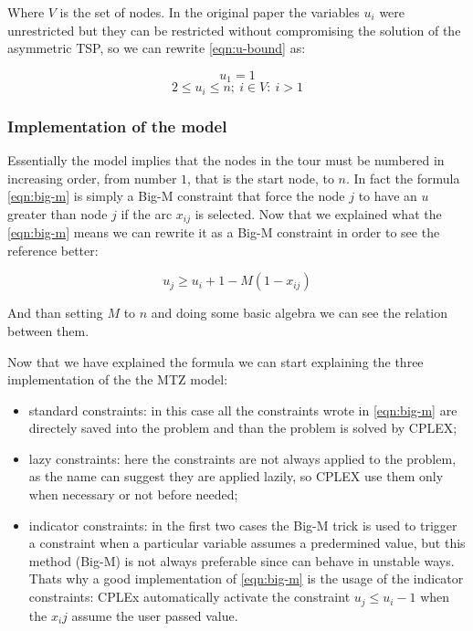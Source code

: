 Where $V$ is the set of nodes. In the original paper the variables $u_i$ were unrestricted but they can be restricted without compromising the solution of the asymmetric TSP, so we can rewrite \ref{eqn:u-bound} as:

\begin{equation}
	u_1=1
\end{equation}
\begin{equation}
	2\le u_i \le n; \: i\in V:\:i>1
\end{equation}

\subsubsection{Implementation of the model}
Essentially the model implies that the nodes in the tour must be numbered in increasing order, from number $1$, that is the start node, to $n$. In fact the formula \ref{eqn:big-m} is simply a Big-M constraint that force the node $j$ to have an $u$ greater than node $j$ if the arc $x_{ij}$ is selected. Now that we explained what the \ref{eqn:big-m} means we can rewrite it as a Big-M constraint in order to see the reference better:

\begin{equation}
	u_j\ge u_i+1-M(1-x_{ij})
\end{equation}

And than setting $M$ to $n$ and doing some basic algebra we can see the relation between them.

Now that we have explained the formula we can start explaining the three implementation of the the MTZ model:

\begin{itemize}
	\item standard constraints: in this case all the constraints wrote in \ref{eqn:big-m} are directely saved into the problem and than the problem is solved by CPLEX;
	\item lazy constraints: here the constraints are not always applied to the problem, as the name can suggest they are applied lazily, so CPLEX use them only when necessary or not before needed;
	\item indicator constraints: in the first two cases the Big-M trick is used to trigger a constraint when a particular variable assumes a predermined value, but this method (Big-M) is not always preferable since can behave in unstable ways. Thats why a good implementation of \ref{eqn:big-m} is the usage of the indicator constraints: CPLEx automatically activate the constraint $u_j\le u_i-1$ when the $x_ij$ assume the user passed value.
\end{itemize}